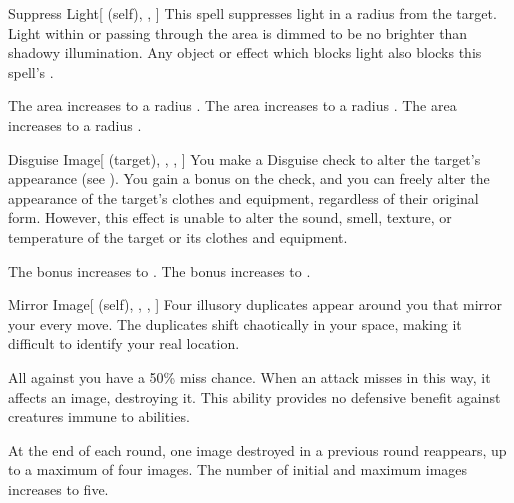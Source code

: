 \lowercase{\hypertarget{spell:Suppress Light}{}}\label{spell:Suppress Light}
\begin{attuneability}[Rank 1]{\hypertarget{spell:Suppress Light}{Suppress Light}}[ (self), , ]
This spell suppresses light in a \areamed radius  from the target.
Light within or passing through the area is dimmed to be no brighter than shadowy illumination.
Any object or effect which blocks light also blocks this spell's .

\rankline
{} The area increases to a \arealarge radius .
 The area increases to a \areahuge radius .
 The area increases to a \areaext radius .
\end{attuneability}
\vspace{0.25em}



\lowercase{\hypertarget{spell:Disguise Image}{}}\label{spell:Disguise Image}
\begin{attuneability}[Rank 3]{\hypertarget{spell:Disguise Image}{Disguise Image}}[ (target), , , ]
You make a Disguise check to alter the target's appearance (see ).
You gain a  bonus on the check, and you can freely alter the appearance of the target's clothes and equipment, regardless of their original form.
However, this effect is unable to alter the sound, smell, texture, or temperature of the target or its clothes and equipment.

\rankline
{} The bonus increases to .
 The bonus increases to .
\end{attuneability}
\vspace{0.25em}



\lowercase{\hypertarget{spell:Mirror Image}{}}\label{spell:Mirror Image}
\begin{attuneability}[Rank 3]{\hypertarget{spell:Mirror Image}{Mirror Image}}[ (self), , , ]
Four illusory duplicates appear around you that mirror your every move.
The duplicates shift chaotically in your space, making it difficult to identify your real location.

All   against you have a 50\% miss chance.
When an attack misses in this way, it affects an image, destroying it.
This ability provides no defensive benefit against creatures immune to  abilities.

\rankline
{} At the end of each round, one image destroyed in a previous round reappears, up to a maximum of four images.
 The number of initial and maximum images increases to five.
\end{attuneability}
\vspace{0.25em}




